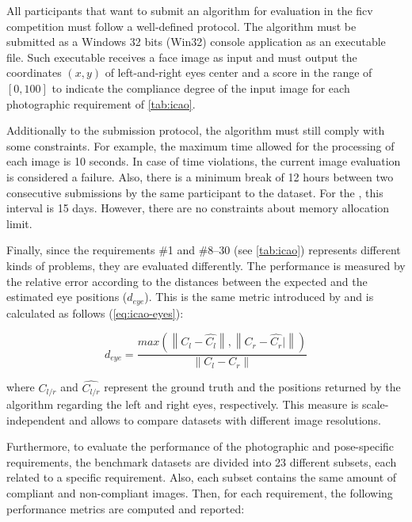 All participants that want to submit an algorithm for evaluation in the \acs{ficv} competition must follow a well-defined protocol. The algorithm must be submitted as a Windows 32 bits (Win32) console application as an executable file. Such executable receives a face image as input and must output the coordinates $(x, y)$ of left-and-right eyes center and a score in the range of $[0, 100]$ to indicate the compliance degree of the input image for each photographic requirement of \autoref{tab:icao}.

Additionally to the submission protocol, the algorithm must still comply with some constraints. For example, the maximum time allowed for the processing of each image is 10 seconds. In case of time violations, the current image evaluation is considered a failure. Also, there is a minimum break of 12 hours between two consecutive submissions by the same participant to the \ficvtest dataset. For the \ficvofficial, this interval is 15 days. However, there are no constraints about memory allocation limit.

Finally, since the requirements \#1 and \#8--30 (see \autoref{tab:icao}) represents different kinds of problems, they are evaluated differently. The \eyecenterlocation performance is measured by the relative error according to the distances between the expected and the estimated eye positions ($d_{eye}$). This is the same metric introduced by \cite{jesorsky2001robust} and is calculated as follows (\autoref{eq:icao-eyes}):

\begin{equation}
\label{eq:icao-eyes}
d_{eye} = \frac{max(\left\| C_l - \hat{C_l} \right\|, \left\| C_r -\hat{C_r}|\right\|)}{\left\| C_l - C_r \right\|}
\end{equation}

\noindent
where $C_{l/r}$ and $\hat{C_{l/r}}$ represent the ground truth and the positions returned by the algorithm regarding the left and right eyes, respectively. This measure is scale-independent and allows to compare datasets with different image resolutions.

Furthermore, to evaluate the performance of the photographic and pose-specific requirements, the benchmark datasets are divided into 23 different subsets, each related to a specific requirement. Also, each subset contains the same amount of compliant and non-compliant images. Then, for each requirement, the following performance metrics are computed and reported:

